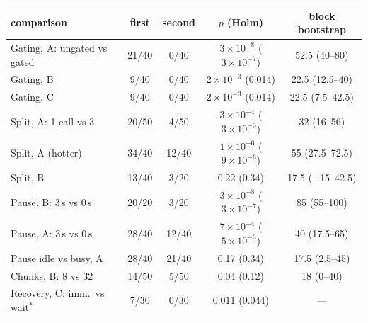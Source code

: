 \begin{tabular}{lcccc}
\toprule
comparison & first & second & $p$ (Holm) & block bootstrap \\
\midrule
Gating, A: ungated vs gated & 21/40 & 0/40 & $3\times10^{-8}$ ($3\times10^{-7}$) & 52.5 (40--80) \\
Gating, B & 9/40 & 0/40 & $2\times10^{-3}$ (0.014) & 22.5 (12.5--40) \\
Gating, C & 9/40 & 0/40 & $2\times10^{-3}$ (0.014) & 22.5 (7.5--42.5) \\
Split, A: 1 call vs 3 & 20/50 & 4/50 & $3\times10^{-4}$ ($3\times10^{-3}$) & 32 (16--56) \\
Split, A (hotter) & 34/40 & 12/40 & $1\times10^{-6}$ ($9\times10^{-6}$) & 55 (27.5--72.5) \\
Split, B & 13/40 & 3/20 & 0.22 (0.34) & 17.5 ($-$15--42.5) \\
Pause, B: 3\,s vs 0\,s & 20/20 & 3/20 & $3\times10^{-8}$ ($3\times10^{-7}$) & 85 (55--100) \\
Pause, A: 3\,s vs 0\,s & 28/40 & 12/40 & $7\times10^{-4}$ ($5\times10^{-3}$) & 40 (17.5--65) \\
Pause idle vs busy, A & 28/40 & 21/40 & 0.17 (0.34) & 17.5 (2.5--45) \\
Chunks, B: 8 vs 32 & 14/50 & 5/50 & 0.04 (0.12) & 18 (0--40) \\
Recovery, C: imm.\ vs wait$^\ast$ & 7/30 & 0/30 & 0.011 (0.044) & --- \\
\bottomrule
\end{tabular}
